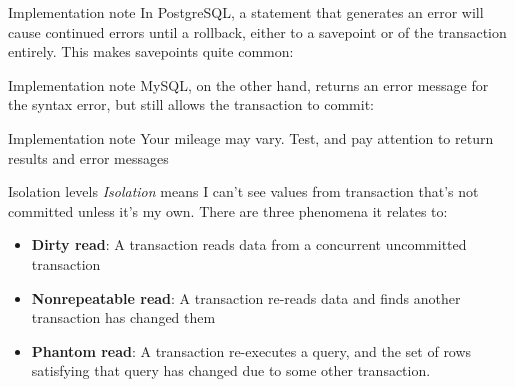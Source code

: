\documentclass[svgnames]{beamer}
\begin{document}
\begin{frame}{Implementation note}
    In PostgreSQL, a statement that generates an error will cause continued
    errors until a rollback, either to a savepoint or of the transaction
    entirely. This makes savepoints quite common: \\
    \vspace{10pt}
    \small{
    }
\end{frame}

\begin{frame}{Implementation note}
    MySQL, on the other hand, returns an error message for the syntax error,
    but still allows the transaction to commit: \\
    \vspace{10pt}
    \small {
    }
\end{frame}

\begin{frame}{Implementation note}
    Your mileage may vary. Test, and pay attention to return results and error
    messages
\end{frame}

\begin{frame}{Isolation levels}
    \textit{Isolation} means I can't see values from transaction that's not
    committed unless it's my own. There are three phenomena it relates to:
    \begin{itemize}
        \item \textbf{Dirty read}: A transaction reads data from a
        concurrent uncommitted transaction
        \item \textbf{Nonrepeatable read}: A transaction re-reads data and
        finds another transaction has changed them
        \item \textbf{Phantom read}: A transaction re-executes a query, and
        the set of rows satisfying that query has changed due to some other
        transaction.
    \end{itemize}
\end{frame}
\end{document}

